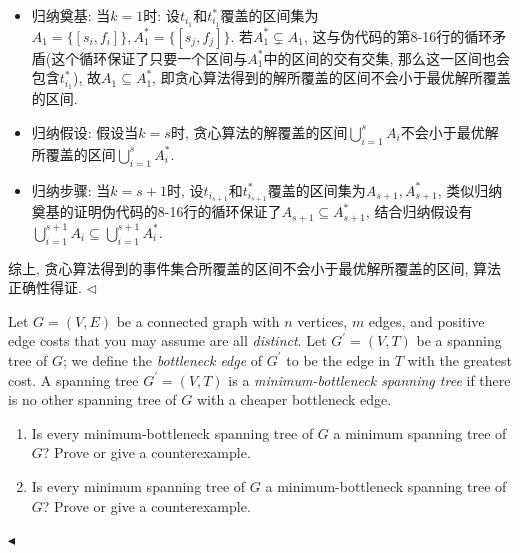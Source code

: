 \documentclass[11pt]{article}
\newenvironment{problem}[2][Problem]{\begin{trivlist}
\item[\hskip \labelsep{\bfseries#1}\hskip\labelsep{\bfseries#2.}]}{\hfill$\blacktriangleleft$\end{trivlist}}
\newenvironment{answer}[1][Answer]{\begin{trivlist}
\item[\hskip \labelsep{\bfseries\itshape#1.}\hskip \labelsep]}{\hfill$\lhd$\end{trivlist}}
\begin{document}
\begin{answer}
\begin{itemize}
    \item 归纳奠基: 当$k = 1$时: 设$t_{i_1}$和$t_{i_1}^*$覆盖的区间集为$A_1 = \{[s_i, f_i]\}, A_{1}^* = \{[s_j, f_j]\}$. 若$A_{1}^* \subsetneq A_{1}$, 这与伪代码的第8-16行的循环矛盾(这个循环保证了只要一个区间与$A_{1}^*$中的区间的交有交集, 那么这一区间也会包含$t_{i_1}^*$), 故$A_1 \subseteq A_{1}^*$, 即贪心算法得到的解所覆盖的区间不会小于最优解所覆盖的区间. 
    \item 归纳假设: 假设当$k = s$时, 贪心算法的解覆盖的区间$\bigcup_{i=1}^{s}A_i$不会小于最优解所覆盖的区间$\bigcup_{i=1}^{s}A_i^*$. 
    \item 归纳步骤: 当$k = s + 1$时, 设$t_{i_{s+1}}$和$t_{i_{s+1}}^*$覆盖的区间集为$A_{s+1},A_{s+1}^*$, 类似归纳奠基的证明伪代码的8-16行的循环保证了$A_{s+1} \subseteq A_{s+1}^*$, 结合归纳假设有$\bigcup_{i=1}^{s+1}A_i \subseteq \bigcup_{i=1}^{s+1}A_i^*$.
\end{itemize}
综上, 贪心算法得到的事件集合所覆盖的区间不会小于最优解所覆盖的区间, 算法正确性得证.
\end{answer}
\begin{problem}{2 (Bottleneck of Spanning Trees)}
    Let $G=(V,E)$ be a connected graph with $n$ vertices, $m$ edges, and positive edge costs that you may assume are all \textit{distinct}. Let $G^{\prime}=(V,T)$ be a spanning tree of $G$; we define the \textit{bottleneck edge} of $G^{\prime}$ to be the edge in $T$ with the greatest cost. A spanning tree $G^{\prime}=(V,T)$ is a \textit{minimum-bottleneck spanning tree} if there is no other spanning tree of $G$ with a cheaper bottleneck edge.
\begin{enumerate}[label=(\arabic*)]
    \item Is every minimum-bottleneck spanning tree of $G$ a minimum spanning tree of $G$? Prove or give a counterexample.
    \item Is every minimum spanning tree of $G$ a minimum-bottleneck spanning tree of $G$? Prove or give a counterexample.
\end{enumerate}
\end{problem}
\end{document}
